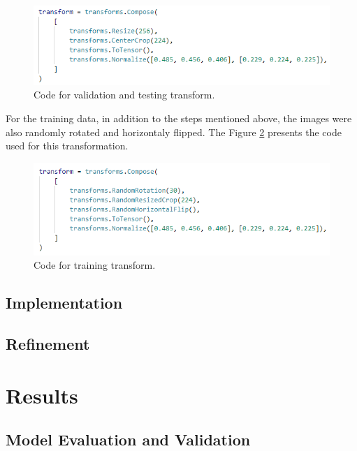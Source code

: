 \documentclass{article}
\begin{document}
    \begin{figure}[htbp]
        \centering
        \includegraphics{img/transform_valid_test.png}
        \caption{Code for validation and testing transform.}
        \label{fig:transform_train_test}
    \end{figure}
    
    For the training data, in addition to the steps mentioned above, the images were also randomly rotated and horizontaly flipped. The Figure \ref*{fig:transform_train} presents the code used for this transformation.
    
    \begin{figure}[htbp]
        \centering
        \includegraphics{img/transform_train.png}
        \caption{Code for training transform.}
        \label{fig:transform_train}
    \end{figure}

    \subsection{Implementation}

    \subsection{Refinement}

    \section{Results}

    \subsection{Model Evaluation and Validation}
\end{document}
